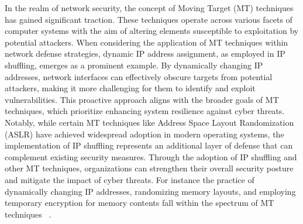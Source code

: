In the realm of network security, the concept of Moving Target (MT) techniques 
has gained significant traction. These techniques operate across various facets 
of computer systems with the aim of altering elements susceptible to exploitation 
by potential attackers. When considering the application of MT techniques within 
network defense strategies, dynamic IP address assignment, as employed in IP 
shuffling, emerges as a prominent example. By dynamically changing IP addresses,
network interfaces can effectively obscure targets from potential attackers, 
making it more challenging for them to identify and exploit vulnerabilities. 
This proactive approach aligns with the broader goals of MT techniques, which 
prioritize enhancing system resilience against cyber threats. Notably, while 
certain MT techniques like Address Space Layout Randomization (ASLR) have achieved
widespread adoption in modern operating systems, the implementation of IP shuffling 
represents an additional layer of defense that can complement existing security measures.
Through the adoption of IP shuffling and other MT techniques, organizations can 
strengthen their overall security posture and mitigate the impact of cyber threats. 
For instance the practice of dynamically changing IP addresses, randomizing memory 
layouts, and employing temporary encryption for memory contents fall within the 
spectrum of MT techniques ~\cite{okhravi2013finding}.
